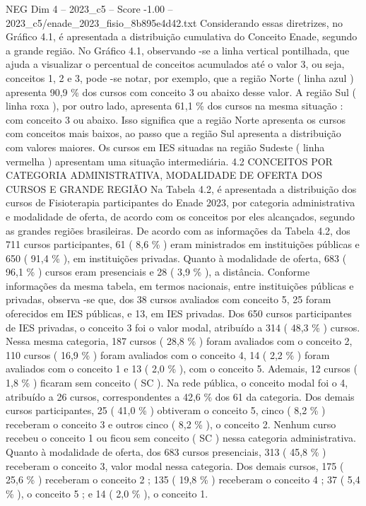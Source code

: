 \begin{textsample}{NEG Dim 4 – 2023\_c5 – Score -1.00 – 2023\_c5/enade\_2023\_fisio\_8b895e4d42.txt}
Considerando essas diretrizes, no Gráfico 4.1, é apresentada a distribuição cumulativa do Conceito Enade, segundo a grande região.
No Gráfico 4.1, observando -se a linha vertical pontilhada, que ajuda a visualizar o percentual de conceitos acumulados até o valor 3, ou seja, conceitos 1, 2 e 3, pode -se notar, por exemplo, que a região Norte ( linha azul ) apresenta 90,9 \% dos cursos com conceito 3 ou abaixo desse valor.
A região Sul ( linha roxa ), por outro lado, apresenta 61,1 \% dos cursos na mesma situação : com conceito 3 ou abaixo.
Isso significa que a região Norte apresenta os cursos com conceitos mais baixos, ao passo que a região Sul apresenta a distribuição com valores maiores.
Os cursos em IES situadas na região Sudeste ( linha vermelha ) apresentam uma situação intermediária. 4.2 CONCEITOS POR CATEGORIA ADMINISTRATIVA, MODALIDADE DE OFERTA DOS CURSOS E GRANDE REGIÃO Na Tabela 4.2, é apresentada a distribuição dos cursos de Fisioterapia participantes do Enade 2023, por categoria administrativa e modalidade de oferta, de acordo com os conceitos por eles alcançados, segundo as grandes regiões brasileiras.
De acordo com as informações da Tabela 4.2, dos 711 cursos participantes, 61 ( 8,6 \% ) eram ministrados em instituições públicas e 650 ( 91,4 \% ), em instituições privadas.
Quanto à modalidade de oferta, 683 ( 96,1 \% ) cursos eram presenciais e 28 ( 3,9 \% ), a distância.
Conforme informações da mesma tabela, em termos nacionais, entre instituições públicas e privadas, observa -se que, dos 38 cursos avaliados com conceito 5, 25 foram oferecidos em IES públicas, e 13, em IES privadas.
Dos 650 cursos participantes de IES privadas, o conceito 3 foi o valor modal, atribuído a 314 ( 48,3 \% ) cursos.
Nessa mesma categoria, 187 cursos ( 28,8 \% ) foram avaliados com o conceito 2, 110 cursos ( 16,9 \% ) foram avaliados com o conceito 4, 14 ( 2,2 \% ) foram avaliados com o conceito 1 e 13 ( 2,0 \% ), com o conceito 5.
Ademais, 12 cursos ( 1,8 \% ) ficaram sem conceito ( SC ).
Na rede pública, o conceito modal foi o 4, atribuído a 26 cursos, correspondentes a 42,6 \% dos 61 da categoria.
Dos demais cursos participantes, 25 ( 41,0 \% ) obtiveram o conceito 5, cinco ( 8,2 \% ) receberam o conceito 3 e outros cinco ( 8,2 \% ), o conceito 2.
Nenhum curso recebeu o conceito 1 ou ficou sem conceito ( SC ) nessa categoria administrativa.
Quanto à modalidade de oferta, dos 683 cursos presenciais, 313 ( 45,8 \% ) receberam o conceito 3, valor modal nessa categoria.
Dos demais cursos, 175 ( 25,6 \% ) receberam o conceito 2 ; 135 ( 19,8 \% ) receberam o conceito 4 ; 37 ( 5,4 \% ), o conceito 5 ; e 14 ( 2,0 \% ), o conceito 1.

\end{textsample}
